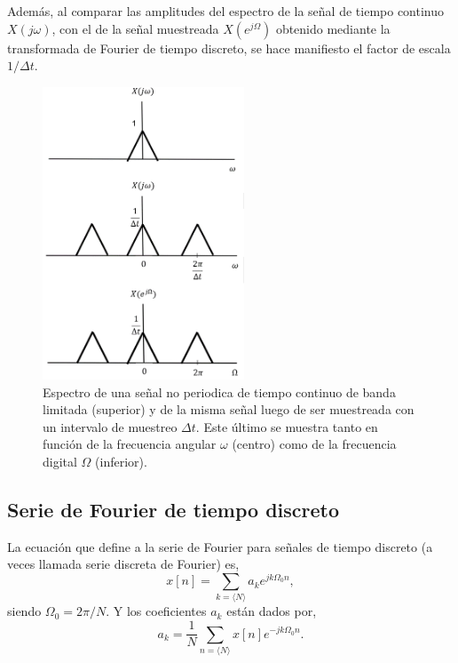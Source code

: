 \documentclass[10pt,a4paper]{article}
\begin{document}
Además, al comparar las amplitudes del espectro de la señal de tiempo continuo $X(j\omega)$, con el de la señal 
muestreada $X(e^{j\Omega})$ obtenido mediante la transformada 
de Fourier de tiempo discreto, se hace manifiesto el factor de escala $1/\Delta t$.

\begin{figure}[h]
	\begin{center}
		\includegraphics[width=6cm]{frec_dig.png}
	\end{center}
	\caption{Espectro de una señal no periodica de tiempo continuo de banda limitada (superior) y de la misma señal 
		luego de ser 
		muestreada con un intervalo de muestreo $\Delta t$. Este último se muestra tanto en función de la frecuencia 
		angular 
		$\omega$ (centro) como de la 
		frecuencia digital $\Omega$ (inferior).}
	\label{fig:frec_dig}
\end{figure}

\subsection*{Serie de Fourier de tiempo discreto}
La ecuación que define a la serie de Fourier para señales de tiempo discreto (a veces llamada serie discreta de Fourier) es,
\begin{equation}
x[n] = \sum_{k=\langle N\rangle} a_k e^{jk\Omega_0n},
\end{equation}
siendo $\Omega_0=2\pi/N$. Y los coeficientes $a_k$ están dados por,
\begin{equation}
a_k = \frac{1}{N} \sum_{n=\langle N\rangle} x[n]e^{-jk\Omega_0n}.
\end{equation}
\end{document}
